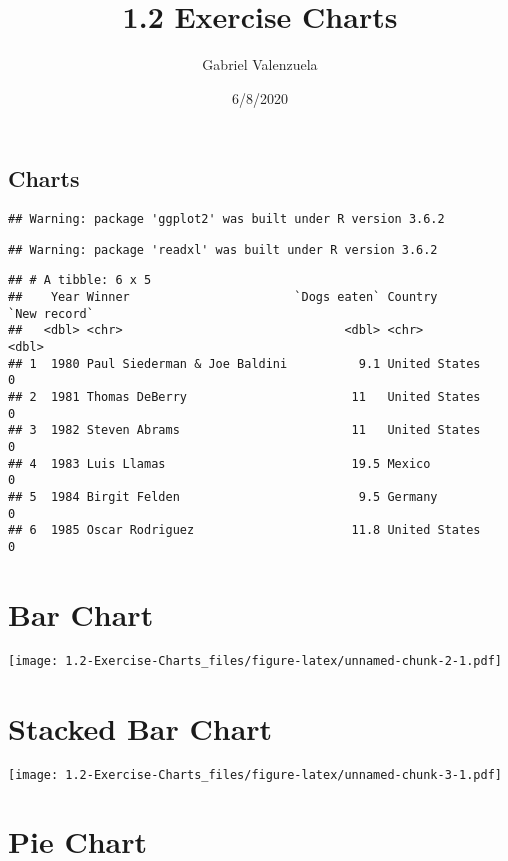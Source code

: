 \documentclass[
]{article}
\title{1.2 Exercise Charts}
\author{Gabriel Valenzuela}
\date{6/8/2020}
\begin{document}
\maketitle

\hypertarget{charts}{%
\subsection{Charts}\label{charts}}

\begin{verbatim}
## Warning: package 'ggplot2' was built under R version 3.6.2
\end{verbatim}

\begin{verbatim}
## Warning: package 'readxl' was built under R version 3.6.2
\end{verbatim}

\begin{verbatim}
## # A tibble: 6 x 5
##    Year Winner                       `Dogs eaten` Country       `New record`
##   <dbl> <chr>                               <dbl> <chr>                <dbl>
## 1  1980 Paul Siederman & Joe Baldini          9.1 United States            0
## 2  1981 Thomas DeBerry                       11   United States            0
## 3  1982 Steven Abrams                        11   United States            0
## 4  1983 Luis Llamas                          19.5 Mexico                   0
## 5  1984 Birgit Felden                         9.5 Germany                  0
## 6  1985 Oscar Rodriguez                      11.8 United States            0
\end{verbatim}

\hypertarget{bar-chart}{%
\section{Bar Chart}\label{bar-chart}}

\texttt{[image: 1.2-Exercise-Charts\_files/figure-latex/unnamed-chunk-2-1.pdf]}

\hypertarget{stacked-bar-chart}{%
\section{Stacked Bar Chart}\label{stacked-bar-chart}}

\texttt{[image: 1.2-Exercise-Charts\_files/figure-latex/unnamed-chunk-3-1.pdf]}

\hypertarget{pie-chart}{%
\section{Pie Chart}\label{pie-chart}}
\end{document}
